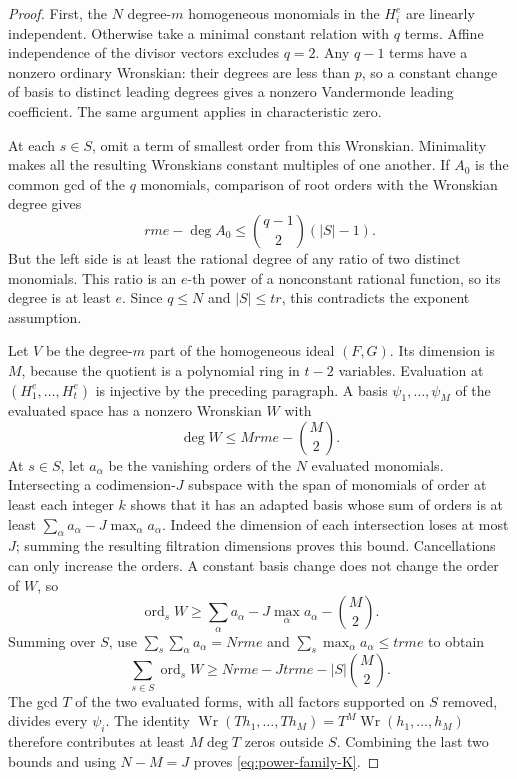 \begin{proof}
First, the $N$ degree-$m$ homogeneous monomials in the $H_i^e$ are
linearly independent. Otherwise take a minimal constant relation with
$q$ terms. Affine independence of the divisor vectors excludes $q=2$.
Any $q-1$ terms have a nonzero ordinary Wronskian: their degrees are
less than $p$, so a constant change of basis to distinct leading degrees
gives a nonzero Vandermonde leading coefficient. The same argument
applies in characteristic zero.

At each $s\in S$, omit a term of smallest order from this Wronskian.
Minimality makes all the resulting Wronskians constant multiples of one
another. If $A_0$ is the common gcd of the $q$ monomials, comparison of
root orders with the Wronskian degree gives
\[
 rme-\deg A_0\le\binom{q-1}{2}(|S|-1).
\]
But the left side is at least the rational degree of any ratio of two
distinct monomials. This ratio is an $e$-th power of a nonconstant
rational function, so its degree is at least $e$. Since $q\le N$ and
$|S|\le tr$, this contradicts the exponent assumption.

Let $V$ be the degree-$m$ part of the homogeneous ideal $(F,G)$.
Its dimension is $M$, because the quotient is a polynomial ring in
$t-2$ variables. Evaluation at $(H_1^e,\ldots,H_t^e)$ is injective by
the preceding paragraph. A basis $\psi_1,\ldots,\psi_M$ of the evaluated
space has a nonzero Wronskian $W$ with
\[
 \deg W\le Mrme-\binom M2.
\]
At $s\in S$, let $a_\alpha$ be the vanishing orders of the $N$
evaluated monomials. Intersecting a codimension-$J$ subspace with the
span of monomials of order at least each integer $k$ shows that it has
an adapted basis whose sum of orders is at least
$\sum_\alpha a_\alpha-J\max_\alpha a_\alpha$.
Indeed the dimension of each intersection loses at most $J$;
summing the resulting filtration dimensions proves this bound.
Cancellations can only increase the orders. A constant basis change
does not change the order of $W$, so
\[
 \operatorname{ord}_s W\ge
 \sum_\alpha a_\alpha-J\max_\alpha a_\alpha-\binom M2.
\]
Summing over $S$, use
$\sum_s\sum_\alpha a_\alpha=Nrme$ and
$\sum_s\max_\alpha a_\alpha\le trme$ to obtain
\[
 \sum_{s\in S}\operatorname{ord}_s W
 \ge Nrme-Jtrme-|S|\binom M2.
\]
The gcd $T$ of the two evaluated forms, with all factors supported on
$S$ removed, divides every $\psi_i$. The identity
$\operatorname{Wr}(Th_1,\ldots,Th_M)=T^M\operatorname{Wr}(h_1,\ldots,h_M)$
therefore contributes at least $M\deg T$ zeros outside $S$.
Combining the last two bounds and using $N-M=J$ proves
\eqref{eq:power-family-K}.
\end{proof}

